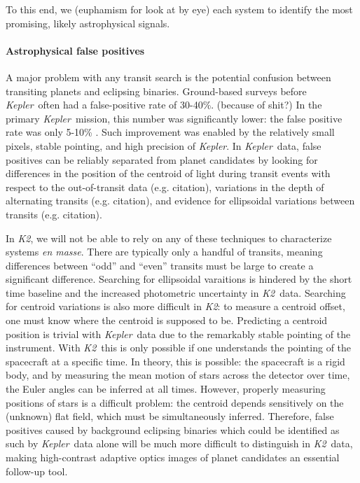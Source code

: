 \documentclass[12pt,preprint]{aastex}
\newcommand{\project}[1]{\textsl{#1}} %
\newcommand{\kepler}{\project{Kepler}}
\newcommand{\KT}{\project{K2}}
\begin{document}
To this end, we (euphamism for look at by eye) each system to identify the
most promising, likely astrophysical signals.

\paragraph{Astrophysical false positives}

A major problem with any transit search is the potential confusion between
transiting planets and eclipsing binaries.
Ground-based surveys before \kepler\ often had a false-positive rate 
of 30-40\%. (because of shit?)
In the primary \kepler\ mission, this number was significantly lower:
the false positive rate was only 5-10\% \citep{morton11}.
Such improvement was enabled by the relatively small pixels, stable 
pointing, and high precision of \kepler.
In \kepler\ data, false positives can be reliably separated from 
planet candidates by looking for differences in the position of the 
centroid of light during transit events with respect to the 
out-of-transit data (e.g. citation), variations in the depth of
alternating transits (e.g. citation), and evidence for ellipsoidal
variations between transits (e.g. citation).

In \KT, we will not be able to rely on any of these techniques to
characterize systems \textit{en masse}. 
There are typically only a handful of transits, meaning differences
between ``odd'' and ``even'' transits must be large to create
a significant difference.
Searching for ellipsoidal varaitions is hindered by the short time
baseline and the increased photometric uncertainty in \KT\ data.
Searching for centroid variations is also more difficult in \KT:
to measure a centroid offset, one must know where the centroid is
supposed to be.
Predicting a centroid position is trivial with \kepler\ data due to the 
remarkably stable pointing of the instrument. 
With \KT\ this is only possible if one understands the pointing of the 
spacecraft at a specific time.
In theory, this is possible: the spacecraft is a rigid body, and by measuring
the mean motion of stars across the detector over time, the 
Euler angles can be inferred at all times.
However, properly measuring positions of stars is a difficult problem:
the centroid depends sensitively on the (unknown) flat field, which must
be simultaneously inferred.
Therefore, false positives caused by background eclipsing binaries which could
be identified as such by \kepler\ data alone will be much more difficult to 
distinguish in \KT\ data, making high-contrast adaptive optics images of 
planet candidates an essential follow-up tool.
\end{document}
